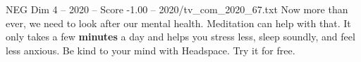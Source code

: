 \begin{textsample}{NEG Dim 4 – 2020 – Score -1.00 – 2020/tv\_com\_2020\_67.txt}  \label{ex:f4_neg_068}
Now more than ever, we need to look after our mental health.
Meditation can help with that.
It only takes a few \textbf{minutes} a day and helps you stress less, sleep soundly, and feel less anxious.
Be kind to your mind with Headspace.
Try it for free.

\end{textsample}
